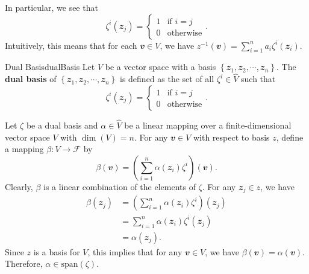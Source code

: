 \documentclass[math, code]{amznotes}
\theoremstyle{remark}
\begin{document}
In particular, we see that
\begin{equation*}
    \zeta^i(\mathbfit{z}_j) = \begin{cases}
        1 & \textrm{if } i = j \\
        0 & \textrm{otherwise}
    \end{cases}.
\end{equation*}
Intuitively, this means that for each $\mathbfit{v} \in V$, we have $z^{-1}(\mathbfit{v}) = \sum_{i = 1}^{n}a_i\zeta^i(\mathbfit{z}_i)$.
\begin{dfnbox}{Dual Basis}{dualBasis}
    Let $V$ be a vector space with a basis $\left\{\mathbfit{z}_1, \mathbfit{z}_2, \cdots, \mathbfit{z}_n\right\}$. The {\color{red} \textbf{dual basis}} of $\left\{\mathbfit{z}_1, \mathbfit{z}_2, \cdots, \mathbfit{z}_n\right\}$ is defined as the set of all $\zeta^i \in \hat{V}$ such that 
    \begin{equation*}
        \zeta^i(\mathbfit{z}_j) = \begin{cases}
            1 & \textrm{if } i = j \\
            0 & \textrm{otherwise}
        \end{cases}.
    \end{equation*}
\end{dfnbox}
Let $\zeta$ be a dual basis and $\alpha \in \hat{V}$ be a linear mapping over a finite-dimensional vector space $V$ with $\dim(V) = n$. For any $\mathbfit{v} \in V$ with respect to basis $z$, define a mapping $\beta \colon V \to \mathcal{F}$ by 
\begin{equation*}
    \beta(\mathbfit{v}) = \left(\sum_{i = 1}^{n}\alpha(\mathbfit{z}_i)\zeta^i\right)(\mathbfit{v}).
\end{equation*}
Clearly, $\beta$ is a linear combination of the elements of $\zeta$. For any $\mathbfit{z}_j \in z$, we have
\begin{align*}
    \beta(\mathbfit{z}_j) & = \left(\sum_{i = 1}^{n}\alpha(\mathbfit{z}_i)\zeta^i\right)(\mathbfit{z}_j) \\
    & = \sum_{i = 1}^{n}\alpha(\mathbfit{z}_i)\zeta^i(\mathbfit{z}_j) \\
    & = \alpha(\mathbfit{z}_j).
\end{align*}
Since $z$ is a basis for $V$, this implies that for any $\mathbfit{v} \in V$, we have $\beta(\mathbfit{v}) = \alpha(\mathbfit{v})$. Therefore, $\alpha \in \mathrm{span}(\zeta)$. 
\end{document}
